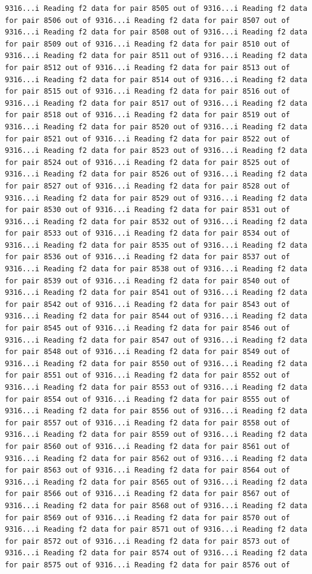 \documentclass[
]{article}
\begin{document}
\begin{verbatim}
9316...i Reading f2 data for pair 8505 out of 9316...i Reading f2 data for pair 8506 out of 9316...i Reading f2 data for pair 8507 out of 9316...i Reading f2 data for pair 8508 out of 9316...i Reading f2 data for pair 8509 out of 9316...i Reading f2 data for pair 8510 out of 9316...i Reading f2 data for pair 8511 out of 9316...i Reading f2 data for pair 8512 out of 9316...i Reading f2 data for pair 8513 out of 9316...i Reading f2 data for pair 8514 out of 9316...i Reading f2 data for pair 8515 out of 9316...i Reading f2 data for pair 8516 out of 9316...i Reading f2 data for pair 8517 out of 9316...i Reading f2 data for pair 8518 out of 9316...i Reading f2 data for pair 8519 out of 9316...i Reading f2 data for pair 8520 out of 9316...i Reading f2 data for pair 8521 out of 9316...i Reading f2 data for pair 8522 out of 9316...i Reading f2 data for pair 8523 out of 9316...i Reading f2 data for pair 8524 out of 9316...i Reading f2 data for pair 8525 out of 9316...i Reading f2 data for pair 8526 out of 9316...i Reading f2 data for pair 8527 out of 9316...i Reading f2 data for pair 8528 out of 9316...i Reading f2 data for pair 8529 out of 9316...i Reading f2 data for pair 8530 out of 9316...i Reading f2 data for pair 8531 out of 9316...i Reading f2 data for pair 8532 out of 9316...i Reading f2 data for pair 8533 out of 9316...i Reading f2 data for pair 8534 out of 9316...i Reading f2 data for pair 8535 out of 9316...i Reading f2 data for pair 8536 out of 9316...i Reading f2 data for pair 8537 out of 9316...i Reading f2 data for pair 8538 out of 9316...i Reading f2 data for pair 8539 out of 9316...i Reading f2 data for pair 8540 out of 9316...i Reading f2 data for pair 8541 out of 9316...i Reading f2 data for pair 8542 out of 9316...i Reading f2 data for pair 8543 out of 9316...i Reading f2 data for pair 8544 out of 9316...i Reading f2 data for pair 8545 out of 9316...i Reading f2 data for pair 8546 out of 9316...i Reading f2 data for pair 8547 out of 9316...i Reading f2 data for pair 8548 out of 9316...i Reading f2 data for pair 8549 out of 9316...i Reading f2 data for pair 8550 out of 9316...i Reading f2 data for pair 8551 out of 9316...i Reading f2 data for pair 8552 out of 9316...i Reading f2 data for pair 8553 out of 9316...i Reading f2 data for pair 8554 out of 9316...i Reading f2 data for pair 8555 out of 9316...i Reading f2 data for pair 8556 out of 9316...i Reading f2 data for pair 8557 out of 9316...i Reading f2 data for pair 8558 out of 9316...i Reading f2 data for pair 8559 out of 9316...i Reading f2 data for pair 8560 out of 9316...i Reading f2 data for pair 8561 out of 9316...i Reading f2 data for pair 8562 out of 9316...i Reading f2 data for pair 8563 out of 9316...i Reading f2 data for pair 8564 out of 9316...i Reading f2 data for pair 8565 out of 9316...i Reading f2 data for pair 8566 out of 9316...i Reading f2 data for pair 8567 out of 9316...i Reading f2 data for pair 8568 out of 9316...i Reading f2 data for pair 8569 out of 9316...i Reading f2 data for pair 8570 out of 9316...i Reading f2 data for pair 8571 out of 9316...i Reading f2 data for pair 8572 out of 9316...i Reading f2 data for pair 8573 out of 9316...i Reading f2 data for pair 8574 out of 9316...i Reading f2 data for pair 8575 out of 9316...i Reading f2 data for pair 8576 out of 
\end{verbatim}
\end{document}
